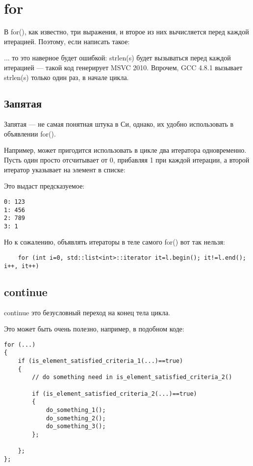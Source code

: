 ﻿\section{for}

В for(), как известно, три выражения, и второе из них вычисляется перед каждой итерацией.
Поэтому, если написать такое:



... то это наверное будет ошибкой: strlen(s) будет вызываться перед каждой итерацией --- такой код генерирует
MSVC 2010. Впрочем, GCC 4.8.1 вызывает strlen(s) только один раз, в начале цикла.

\subsection{Запятая}

Запятая --- не самая понятная штука в Си, однако, их удобно использовать в объявлении for().

Например, может пригодится использовать в цикле два итератора одновременно. Пусть один просто отсчитывает
от 0, прибавляя 1 при каждой итерации, а второй итератор указывает на элемент в списке:



Это выдаст предсказуемое:

\begin{lstlisting}
0: 123
1: 456
2: 789
3: 1
\end{lstlisting}

Но к сожалению, объявлять итераторы в теле самого for() вот так нельзя:

\begin{lstlisting}
	for (int i=0, std::list<int>::iterator it=l.begin(); it!=l.end(); i++, it++)
\end{lstlisting}

\subsection{continue}

continue это безусловный переход на конец тела цикла.

Это может быть очень полезно, например, в подобном коде:

\begin{lstlisting}
for (...)
{
	if (is_element_satisfied_criteria_1(...)==true)
	{
		// do something need in is_element_satisfied_criteria_2()

		if (is_element_satisfied_criteria_2(...)==true)
		{
			do_something_1();
			do_something_2();
			do_something_3();
		};

	};
};
\end{lstlisting}

